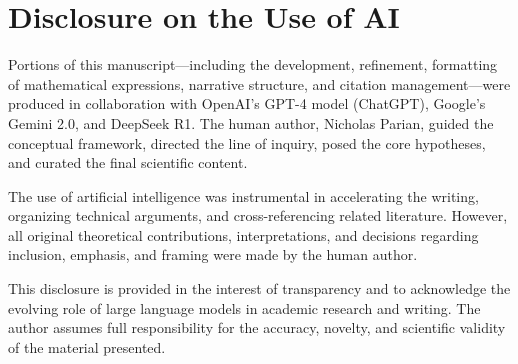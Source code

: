 \section*{Disclosure on the Use of AI}
\label{appendix:disclosure}

Portions of this manuscript—including the development, refinement, formatting of mathematical expressions, narrative structure, and citation management—were produced in collaboration with OpenAI's GPT-4 model (ChatGPT), Google's Gemini 2.0, and DeepSeek R1. The human author, Nicholas Parian, guided the conceptual framework, directed the line of inquiry, posed the core hypotheses, and curated the final scientific content.

The use of artificial intelligence was instrumental in accelerating the writing, organizing technical arguments, and cross-referencing related literature. However, all original theoretical contributions, interpretations, and decisions regarding inclusion, emphasis, and framing were made by the human author.

This disclosure is provided in the interest of transparency and to acknowledge the evolving role of large language models in academic research and writing. The author assumes full responsibility for the accuracy, novelty, and scientific validity of the material presented.
